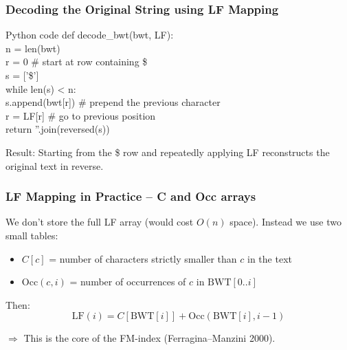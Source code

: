 \documentclass[
11pt, %
aspectratio=169, %
]{beamer}
\begin{document}
\begin{frame}[fragile]
	\frametitle{Decoding the Original String using LF Mapping}
	
	
	\begin{block}{Python code}
	{\ttfamily
		def decode\_bwt(bwt, LF):\\
		\quad n = len(bwt)\\
		\quad r = 0 \quad \quad \quad \quad \quad \quad \quad \quad \# start at row containing \$\\
		\quad s = ['\$']\\
		\quad while len(s) < n:\\
		\quad \quad s.append(bwt[r]) \quad \quad \# prepend the previous character\\
		\quad \quad r = LF[r] \quad \quad \quad \quad \quad \# go to previous position\\
		\quad return ''.join(reversed(s))
	}
	\end{block}
	
	\bigskip
	\alert{Result:} Starting from the \$ row and repeatedly applying LF reconstructs the original text in reverse.
\end{frame}

\begin{frame}
	\frametitle{LF Mapping in Practice – C and Occ arrays}
	
	We don’t store the full LF array (would cost $O(n)$ space).  
	Instead we use two small tables:
	
	\begin{itemize}
		\item $C[c]$ = number of characters \alert{strictly smaller} than $c$ in the text
		\item $\text{Occ}(c,i)$ = number of occurrences of $c$ in $\text{BWT}[0..i]$
	\end{itemize}
	
	\bigskip
	Then:
	\[
	\text{LF}(i) = C[\text{BWT}[i]] + \text{Occ}(\text{BWT}[i], i-1)
	\]
	
	$\Rightarrow$ This is the core of the \alert{FM-index} (Ferragina–Manzini 2000).
\end{frame}
\end{document}
